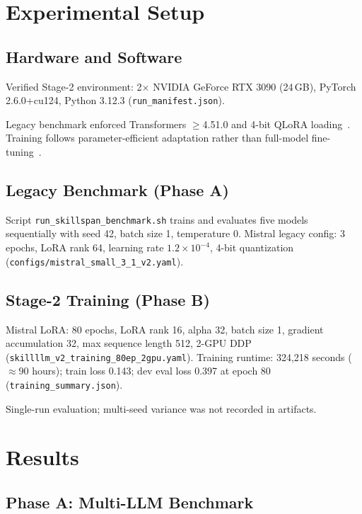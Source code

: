 \documentclass[12pt,oneside]{report}
\begin{document}
\chapter{Experimental Setup}
\label{ch:setup}

\section{Hardware and Software}

Verified Stage-2 environment: 2$\times$ NVIDIA GeForce RTX 3090 (24\,GB), PyTorch 2.6.0+cu124, Python 3.12.3 (\texttt{run\_manifest.json}).

Legacy benchmark enforced Transformers $\geq$4.51.0 and 4-bit QLoRA loading~\cite{dettmers2023qlora}.
Training follows parameter-efficient adaptation rather than full-model fine-tuning~\cite{howard2018ulmfit,hu2022lora}.

\section{Legacy Benchmark (Phase A)}

Script \texttt{run\_skillspan\_benchmark.sh} trains and evaluates five models sequentially with seed 42, batch size 1, temperature 0.
Mistral legacy config: 3 epochs, LoRA rank 64, learning rate $1.2 \times 10^{-4}$, 4-bit quantization (\texttt{configs/mistral\_small\_3\_1\_v2.yaml}).

\section{Stage-2 Training (Phase B)}

Mistral LoRA: 80 epochs, LoRA rank 16, alpha 32, batch size 1, gradient accumulation 32, max sequence length 512, 2-GPU DDP (\texttt{skillllm\_v2\_training\_80ep\_2gpu.yaml}).
Training runtime: 324{,}218 seconds ($\approx$90 hours); train loss 0.143; dev eval loss 0.397 at epoch 80 (\texttt{training\_summary.json}).

Single-run evaluation; multi-seed variance was not recorded in artifacts.

\chapter{Results}
\label{ch:results}

\section{Phase A: Multi-LLM Benchmark}
\end{document}

